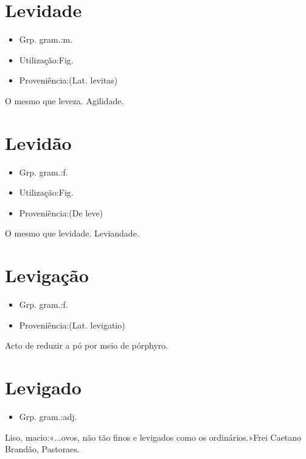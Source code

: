 \section{Levidade}
\begin{itemize}
\item {Grp. gram.:m.}
\end{itemize}
\begin{itemize}
\item {Utilização:Fig.}
\end{itemize}
\begin{itemize}
\item {Proveniência:(Lat. \textunderscore levitas\textunderscore )}
\end{itemize}
O mesmo que \textunderscore leveza\textunderscore .
Agilidade.
\section{Levidão}
\begin{itemize}
\item {Grp. gram.:f.}
\end{itemize}
\begin{itemize}
\item {Utilização:Fig.}
\end{itemize}
\begin{itemize}
\item {Proveniência:(De \textunderscore leve\textunderscore )}
\end{itemize}
O mesmo que \textunderscore levidade\textunderscore .
Leviandade.
\section{Levigação}
\begin{itemize}
\item {Grp. gram.:f.}
\end{itemize}
\begin{itemize}
\item {Proveniência:(Lat. \textunderscore levigatio\textunderscore )}
\end{itemize}
Acto de reduzir a pó por meio de pórphyro.
\section{Levigado}
\begin{itemize}
\item {Grp. gram.:adj.}
\end{itemize}
Liso, macio:«\textunderscore ...ovos, não tão finos e levigados como os ordinários.\textunderscore »Frei Caetano Brandão, \textunderscore Pastoraes\textunderscore .
